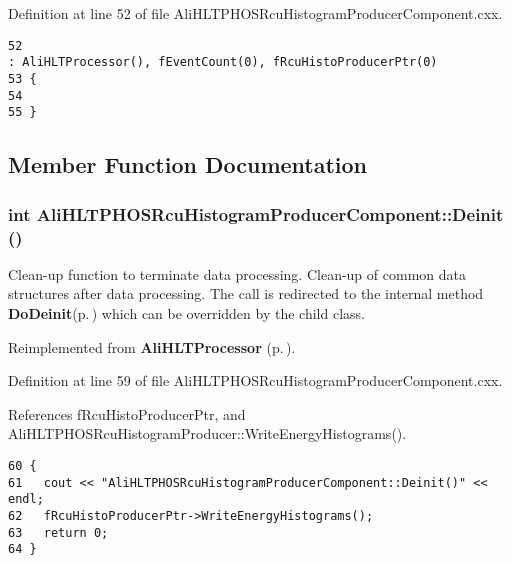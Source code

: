 Definition at line 52 of file Ali\-HLTPHOSRcu\-Histogram\-Producer\-Component.cxx.

\footnotesize\begin{verbatim}52                                                                                                                                   : AliHLTProcessor(), fEventCount(0), fRcuHistoProducerPtr(0)
53 {
54 
55 }
\end{verbatim}\normalsize 




\subsection{Member Function Documentation}
\subsubsection{\setlength{\rightskip}{0pt plus 5cm}int Ali\-HLTPHOSRcu\-Histogram\-Producer\-Component::Deinit ()\hspace{0.3cm}{\tt  [virtual]}}\label{classAliHLTPHOSRcuHistogramProducerComponent_a3}


Clean-up function to terminate data processing. Clean-up of common data structures after data processing. The call is redirected to the internal method {\bf Do\-Deinit}{\rm (p.\,\pageref{classAliHLTPHOSRcuHistogramProducerComponent_a4})} which can be overridden by the child class. 

Reimplemented from {\bf Ali\-HLTProcessor} {\rm (p.\,\pageref{classAliHLTProcessor_a3})}.

Definition at line 59 of file Ali\-HLTPHOSRcu\-Histogram\-Producer\-Component.cxx.

References f\-Rcu\-Histo\-Producer\-Ptr, and Ali\-HLTPHOSRcu\-Histogram\-Producer::Write\-Energy\-Histograms().

\footnotesize\begin{verbatim}60 {
61   cout << "AliHLTPHOSRcuHistogramProducerComponent::Deinit()" << endl;
62   fRcuHistoProducerPtr->WriteEnergyHistograms();
63   return 0;
64 }
\end{verbatim}\normalsize 


